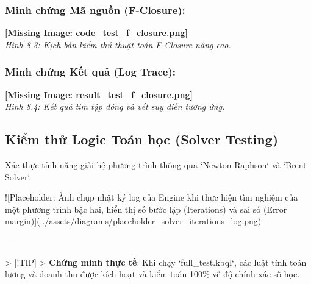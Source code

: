\subsubsection{Minh chứng Mã nguồn (F-Closure):}
\textbf{[Missing Image: code_test_f_closure.png]}\\ \textit{Hình 8.3: Kịch bản kiểm thử thuật toán F-Closure nâng cao.}

\subsubsection{Minh chứng Kết quả (Log Trace):}
\textbf{[Missing Image: result_test_f_closure.png]}\\ \textit{Hình 8.4: Kết quả tìm tập đóng và vết suy diễn tương ứng.}

\subsection{Kiểm thử Logic Toán học (Solver Testing)}

Xác thực tính năng giải hệ phương trình thông qua `Newton-Raphson` và `Brent Solver`.

![Placeholder: Ảnh chụp nhật ký log của Engine khi thực hiện tìm nghiệm của một phương trình bậc hai, hiển thị số bước lặp (Iterations) và sai số (Error margin)](../assets/diagrams/placeholder\_solver\_iterations\_log.png)

---

> [!TIP]
> \textbf{Chứng minh thực tế}: Khi chạy `full\_test.kbql`, các luật tính toán lương và doanh thu được kích hoạt và kiểm toán 100\% về độ chính xác số học.

